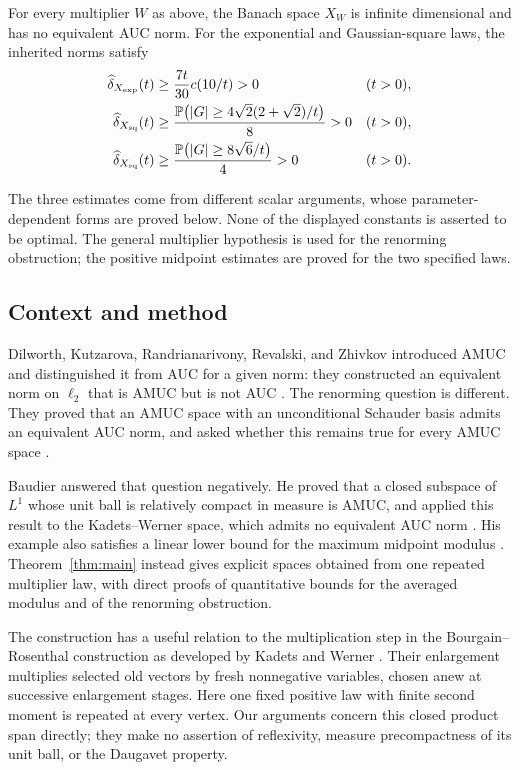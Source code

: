 \begin{theorem}\label{thm:main}
For every multiplier $W$ as above, the Banach space $X_W$ is infinite
dimensional and has no equivalent AUC norm.
For the exponential and Gaussian-square laws, the inherited norms satisfy
\begin{align}
 \widehat\delta_{X_{\mathrm{exp}}}(t)
 &\ge \frac{7t}{30}c(10/t)>0 &&(t>0),\label{eq:main-exp}\\
 \widehat\delta_{X_{\mathrm{sq}}}(t)
 &\ge\frac{\mathbb P\bigl(|G|\ge4\sqrt2(2+\sqrt2)/t\bigr)}{8}>0
 &&(t>0),\label{eq:main-sq24}\\
 \widehat\delta_{X_{\mathrm{sq}}}(t)
 &\ge\frac{\mathbb P\bigl(|G|\ge8\sqrt6/t\bigr)}{4}>0
 &&(t>0).\label{eq:main-sq12}
\end{align}
\end{theorem}

The three estimates come from different scalar arguments, whose
parameter-dependent forms are proved below. None of the displayed constants is
asserted to be optimal. The general multiplier hypothesis is used for the
renorming obstruction; the positive midpoint estimates are proved for the
two specified laws.

\subsection*{Context and method}
Dilworth, Kutzarova, Randrianarivony, Revalski, and Zhivkov introduced
AMUC and distinguished it from AUC for a given norm: they constructed an
equivalent norm on $\ell_2$ that is AMUC but is not AUC
\cite[Theorem~2.4]{DKRRZ2016}. The renorming question is different. They
proved that an AMUC space with an unconditional Schauder basis admits an
equivalent AUC norm, and asked whether this remains true for every AMUC
space \cite[Section~5 and Proposition~5.1]{DKRRZ2016}.

Baudier answered that question negatively. He proved that a closed
subspace of $L^1$ whose unit ball is relatively compact in measure is
AMUC, and applied this result to the Kadets--Werner space, which admits
no equivalent AUC norm \cite[Theorem~1 and Corollary~1]{Baudier2026}.
His example also satisfies a linear lower bound for the maximum midpoint
modulus \cite[final paragraph]{Baudier2026}. Theorem~\ref{thm:main}
instead gives explicit spaces obtained from one repeated multiplier law,
with direct proofs of quantitative bounds for the averaged modulus and
of the renorming obstruction.

The construction has a useful relation to the multiplication step in
the Bourgain--Rosenthal construction \cite{BourgainRosenthal1980} as
developed by Kadets and Werner \cite[Lemmas~2.2 and~2.4]{KW2004}.
Their enlargement multiplies selected old vectors by fresh nonnegative
variables, chosen anew at successive enlargement stages. Here one fixed
positive law with finite second moment is repeated at every vertex.
Our arguments concern this closed product span directly; they
make no assertion of reflexivity, measure precompactness of its unit ball,
or the Daugavet property.


